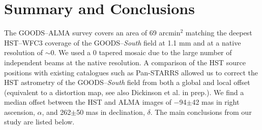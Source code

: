 \documentclass[longauth]{aa}
\begin{document}
\section{Summary and Conclusions}\label{sec:Conclusion}
The GOODS--ALMA survey covers an area of 69 arcmin$^2$ matching the deepest HST--WFC3 coverage of the GOODS--\textit{South} field at 1.1 mm and at a native resolution of $\sim$0. We used a 0 tapered mosaic due to the large number of independent beams at the native resolution. A comparison of the HST source positions with existing catalogues such as Pan-STARRS allowed us to correct the HST astrometry of the GOODS--\textit{South} field from both a global and local offset (equivalent to a distortion map, see also Dickinson et al. in prep.). We find a median offset between the HST and ALMA images of $-$94$\pm$42 mas in right ascension, $\alpha$, and 262$\pm$50 mas in declination, $\delta$. The main conclusions from our study are listed below.
\end{document}
